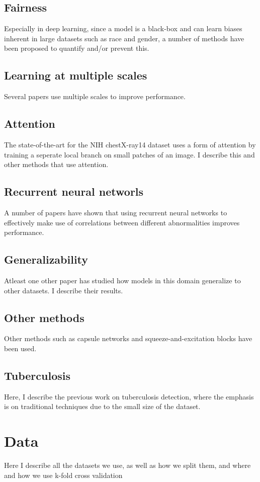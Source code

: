 \documentclass[11pt,twoside,a4paper]{report}
\begin{document}
    \section{Fairness}
    Especially in deep learning, since a model is a black-box and can learn biases inherent in large datasets
    such as race and gender, a number of methods have been proposed to quantify and/or prevent this.
    \section{Learning at multiple scales}
    Several papers use multiple scales to improve performance.
    \section{Attention}
    The state-of-the-art for the NIH chestX-ray14 dataset uses a form of attention by training a seperate
    local branch on small patches of an image. I describe this and other methods that use attention.
    \section{Recurrent neural networls}
    A number of papers have shown that using recurrent neural networks to effectively make use of correlations
    between different abnormalities improves performance.
    \section{Generalizability}
    Atleast one other paper has studied how models in this domain generalize to other datasets. I describe
    their results.
    \section{Other methods}
    Other methods such as capsule networks and squeeze-and-excitation blocks have been used. 
    \section{Tuberculosis}
    Here, I describe the previous work on tuberculosis detection, where the emphasis is on traditional
    techniques due to the small size of the dataset.
\chapter{Data}
Here I describe all the datasets we use, as well as how we split them, and where and how we use k-fold
cross validation
\end{document}

